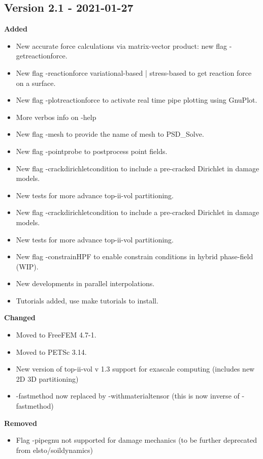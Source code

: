 \subsection{Version 2.1 - 2021-01-27}
\textbf{Added}
\begin{itemize}
    \item New accurate force calculations via matrix-vector product: new flag {\ttfamily -getreactionforce}.
    \item New flag {\ttfamily  -reactionforce} variational-based | stress-based to get reaction force on a surface.
    \item New flag {\ttfamily  -plotreactionforce} to activate real time pipe plotting using GnuPlot.
    \item More verbos info on {\ttfamily -help}    
    \item New flag {\ttfamily -mesh} to provide the name of mesh to {\ttfamily PSD\_Solve}.
    \item New flag {\ttfamily -pointprobe} to postprocess point fields.
    \item New flag {\ttfamily-crackdirichletcondition} to include a pre-cracked Dirichlet in damage models.
    \item New tests for more advance top-ii-vol partitioning.     
    \item New flag {\ttfamily -crackdirichletcondition} to include a pre-cracked Dirichlet in damage models.
    \item New tests for more advance top-ii-vol partitioning.
    \item New flag {\ttfamily -constrainHPF} to enable constrain conditions in hybrid phase-field (WIP).
    \item New developments in parallel interpolations.
    \item Tutorials added, use {\ttfamily make tutorials} to install.
\end{itemize}
\textbf{Changed}
\begin{itemize}
	\item Moved to FreeFEM 4.7-1.
	\item Moved to PETSc 3.14.
	\item New version of top-ii-vol v 1.3 support for exascale computing (includes new 2D 3D partitioning)
	\item {\ttfamily-fastmethod}  now replaced by {\ttfamily-withmaterialtensor} (this is now inverse of {\ttfamily-fastmethod})	
\end{itemize}
\textbf{Removed}
\begin{itemize}
    \item Flag {\ttfamily-pipegnu} not supported for damage mechanics (to be further deprecated from elsto/soildynamics) 
\end{itemize}
